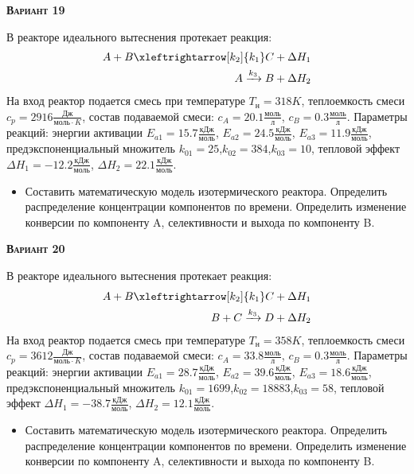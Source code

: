 \textsc{\textbf{Вариант 19}}

 В реакторе идеального вытеснения протекает реакция: \begin{equation*} \begin{aligned} A+B \xleftrightarrow[k_2]{k_1} C +\Delta H_1 \\ A \xrightarrow{k_3} B + \Delta H_2 \end{aligned} \end{equation*}                             На вход  реактор подается смесь при температуре $ T_{н} =  318 K$, теплоемкость смеси $c_p= 2916 \frac{Дж}{моль \cdot K}$, состав подаваемой смеси: $c_A=20.1 \frac{моль}{л}$, $c_B=0.3 \frac{моль}{л}$. Параметры реакций: энергии активации $E_{a1}=15.7 \frac{кДж}{моль}$, $E_{a2}=24.5  \frac{кДж}{моль}$, $E_{a3}=11.9  \frac{кДж}{моль}$, предэкспоненциальный множитель $k_{01}=        25$,$k_{02}=       384$,$k_{03}=        10$, тепловой эффект $\Delta H_1= -12.2  \frac{кДж}{моль}$, $\Delta H_2=22.1 \frac{кДж}{моль}$.\begin{itemize} \item Составить математическую модель изотермического реактора. Определить распределение концентрации компонентов по времени. Определить изменение конверсии по компоненту A, селективности и выхода по компоненту B. \end{itemize}

\textsc{\textbf{Вариант 20}}

 В реакторе идеального вытеснения протекает реакция: \begin{equation*} \begin{aligned} A+B \xleftrightarrow[k_2]{k_1} C + \Delta H_1 \\ B + C \xrightarrow{k_3} D + \Delta H_2 \end{aligned} \end{equation*}                        На вход  реактор подается смесь при температуре $ T_{н} =  358 K$, теплоемкость смеси $c_p= 3612 \frac{Дж}{моль \cdot K}$, состав подаваемой смеси: $c_A=33.8 \frac{моль}{л}$, $c_B=0.3 \frac{моль}{л}$. Параметры реакций: энергии активации $E_{a1}=28.7 \frac{кДж}{моль}$, $E_{a2}=39.6  \frac{кДж}{моль}$, $E_{a3}=18.6  \frac{кДж}{моль}$, предэкспоненциальный множитель $k_{01}=      1699$,$k_{02}=     18883$,$k_{03}=        58$, тепловой эффект $\Delta H_1= -38.7  \frac{кДж}{моль}$, $\Delta H_2=12.1 \frac{кДж}{моль}$.\begin{itemize} \item Составить математическую модель изотермического реактора. Определить распределение концентрации компонентов по времени. Определить изменение конверсии по компоненту A, селективности и выхода по компоненту B. \end{itemize}

